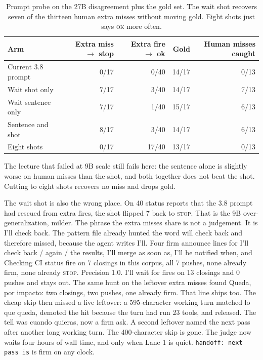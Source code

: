 \begin{table}[ht]
\centering
{\small\begin{tabular}{lrrrr}
\toprule
Arm & Extra miss $\rightarrow$ stop & Extra fire $\rightarrow$ ok & Gold & Human misses caught \\
\midrule
Current 3.8 prompt & 0/17 & 0/40 & 14/17 & 0/13 \\
Wait shot only & 7/17 & 3/40 & 14/17 & 7/13 \\
Wait sentence only & 7/17 & 1/40 & 15/17 & 6/13 \\
Sentence and shot & 8/17 & 3/40 & 14/17 & 6/13 \\
Eight shots & 0/17 & 17/40 & 13/17 & 0/13 \\
\bottomrule
\end{tabular}}
\caption{Prompt probe on the 27B disagreement plus the gold set.
The wait shot recovers seven of the thirteen human extra misses
without moving gold. Eight shots just says \textsc{ok} more often.}
\label{tab:probe}
\end{table}

The lecture that failed at 9B scale still fails here: the sentence
alone is slightly worse on human misses than the shot, and both
together does not beat the shot. Cutting to eight shots recovers no
miss and drops gold.

The wait shot is also the wrong place. On 40 status reports that the
3.8 prompt had rescued from extra fires, the shot flipped 7 back to
\textsc{stop}. That is the 9B over-generalization, milder. The
phrase the extra misses share is not a judgement. It is
I'll check back. The pattern file already hunted the word
will check back and therefore missed, because the agent writes
I'll. Four firm announce lines for I'll check back / again /
the results, I'll merge as soon as, I'll be notified when, and
Checking CI status fire on 7 closings in this corpus, all 7
pushes, none already firm, none already \textsc{stop}. Precision
1.0. I'll wait for fires on 13 closings and 0 pushes and stays
out. The same hunt on the leftover extra misses found Queda, por impacto: two closings, two pushes, one already firm. That line ships too.
 The cheap skip then missed a live leftover: a 595-character working turn matched lo que queda, demoted the hit because the turn had run 23 tools, and released. The tell was cuando quieras, now a firm ask. A second leftover named the next pass after another long working turn. The 400-character skip is gone. The judge now waits four hours of wall time, and only when Lane 1 is quiet. \texttt{handoff: next pass is} is firm on any clock.


